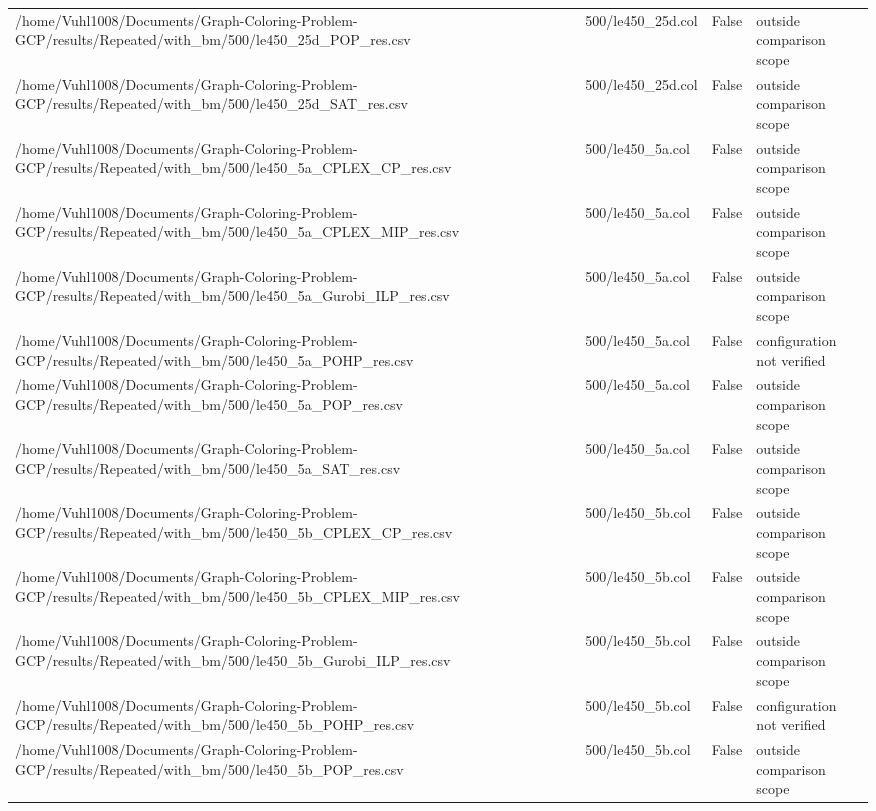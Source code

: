 \begin{table}[htbp]
\begin{tabular}{llll}
/home/Vuhl1008/Documents/Graph-Coloring-Problem-GCP/results/Repeated/with\_bm/500/le450\_25d\_POP\_res.csv & 500/le450\_25d.col & False & outside comparison scope \\
/home/Vuhl1008/Documents/Graph-Coloring-Problem-GCP/results/Repeated/with\_bm/500/le450\_25d\_SAT\_res.csv & 500/le450\_25d.col & False & outside comparison scope \\
/home/Vuhl1008/Documents/Graph-Coloring-Problem-GCP/results/Repeated/with\_bm/500/le450\_5a\_CPLEX\_CP\_res.csv & 500/le450\_5a.col & False & outside comparison scope \\
/home/Vuhl1008/Documents/Graph-Coloring-Problem-GCP/results/Repeated/with\_bm/500/le450\_5a\_CPLEX\_MIP\_res.csv & 500/le450\_5a.col & False & outside comparison scope \\
/home/Vuhl1008/Documents/Graph-Coloring-Problem-GCP/results/Repeated/with\_bm/500/le450\_5a\_Gurobi\_ILP\_res.csv & 500/le450\_5a.col & False & outside comparison scope \\
/home/Vuhl1008/Documents/Graph-Coloring-Problem-GCP/results/Repeated/with\_bm/500/le450\_5a\_POHP\_res.csv & 500/le450\_5a.col & False & configuration not verified \\
/home/Vuhl1008/Documents/Graph-Coloring-Problem-GCP/results/Repeated/with\_bm/500/le450\_5a\_POP\_res.csv & 500/le450\_5a.col & False & outside comparison scope \\
/home/Vuhl1008/Documents/Graph-Coloring-Problem-GCP/results/Repeated/with\_bm/500/le450\_5a\_SAT\_res.csv & 500/le450\_5a.col & False & outside comparison scope \\
/home/Vuhl1008/Documents/Graph-Coloring-Problem-GCP/results/Repeated/with\_bm/500/le450\_5b\_CPLEX\_CP\_res.csv & 500/le450\_5b.col & False & outside comparison scope \\
/home/Vuhl1008/Documents/Graph-Coloring-Problem-GCP/results/Repeated/with\_bm/500/le450\_5b\_CPLEX\_MIP\_res.csv & 500/le450\_5b.col & False & outside comparison scope \\
/home/Vuhl1008/Documents/Graph-Coloring-Problem-GCP/results/Repeated/with\_bm/500/le450\_5b\_Gurobi\_ILP\_res.csv & 500/le450\_5b.col & False & outside comparison scope \\
/home/Vuhl1008/Documents/Graph-Coloring-Problem-GCP/results/Repeated/with\_bm/500/le450\_5b\_POHP\_res.csv & 500/le450\_5b.col & False & configuration not verified \\
/home/Vuhl1008/Documents/Graph-Coloring-Problem-GCP/results/Repeated/with\_bm/500/le450\_5b\_POP\_res.csv & 500/le450\_5b.col & False & outside comparison scope \\

\end{tabular}
\end{table}
